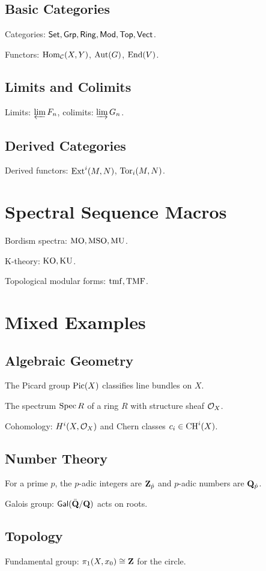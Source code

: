 \documentclass[11pt]{scrartcl}
\begin{document}
\subsection{Basic Categories}
Categories: ${\mathsf{Set}}, {\mathsf{Grp}}, \mathsf{Ring}, {\mathsf{Mod}}, {\mathsf{Top}}, { \mathsf{Vect}}$.

Functors: ${ \operatorname{Hom} }_{{\mathcal{C}}}(X, Y)$, $\operatorname{Aut}(G)$, ${ \operatorname{End} }(V)$.

\subsection{Limits and Colimits}
Limits: $\varprojlim F_n$, colimits: $\varinjlim G_n$.

\subsection{Derived Categories}
Derived functors: $\operatorname{Ext}^i(M, N)$, $\operatorname{Tor}_i(M, N)$.

\section{Spectral Sequence Macros}

Bordism spectra: ${\operatorname{MO}}, {\operatorname{MSO}}, {\operatorname{MU}}$.

K-theory: ${\operatorname{KO}}, {\operatorname{KU}}$.

Topological modular forms: $\mathrm{tmf}, \mathrm{TMF}$.

\section{Mixed Examples}

\subsection{Algebraic Geometry}
The Picard group $\operatorname{Pic}(X)$ classifies line bundles on $X$.

The spectrum $\operatorname{Spec} R$ of a ring $R$ with structure sheaf ${\mathcal{O}}_X$.

Cohomology: $H^i(X, {\mathcal{O}}_X)$ and Chern classes $c_i \in {\operatorname{CH}}^i(X)$.

\subsection{Number Theory}
For a prime $p$, the $p$-adic integers are ${ {\mathbf{Z}}_{\hat p} }$ and $p$-adic numbers are ${ {\mathbf{Q}}_{\hat p} }$.

Galois group: ${ \mathsf{Gal}}({ \bar{ \mathbf{Q} } } / {\mathbf{Q}})$ acts on roots.

\subsection{Topology}
Fundamental group: $\pi_1(X, x_0) \cong {\mathbf{Z}}$ for the circle.
\end{document}
